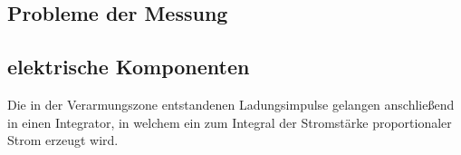 \subsection{Probleme der Messung}

\subsection{elektrische Komponenten}
Die in der Verarmungszone entstandenen Ladungsimpulse gelangen anschließend in einen Integrator, in welchem ein zum Integral der Stromstärke proportionaler Strom erzeugt wird.
